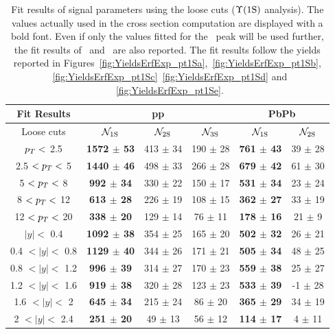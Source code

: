 \begin{table}[hbtp]
  \begin{centering}
    \begin{tabular}{c|c|c|c|c|c}
      \hline
      Fit Results &  \multicolumn{3}{c}{pp} \vline& \multicolumn{2}{c}{PbPb}  \\                                               
      \hline
      Loose cuts & ${\cal N}_{\rm 1S}$ & ${\cal N}_{\rm 2S}$ & ${\cal N}_{\rm 3S}$  &  ${\cal N}_{\rm 1S}$ &  ${\cal N}_{\rm 2S}$ \\  
      \hline                                                                                                   
      $p_{T} <$ 2.5 & \textbf{1572 $\pm$ 53} &  413 $\pm$ 34 &  190 $\pm$ 28 & \textbf{761 $\pm$ 43} & 39 $\pm$ 28 \\  
      2.5 $< p_{T} <$ 5 & \textbf{1440 $\pm$ 46} & 498 $\pm$ 33 &  266 $\pm$ 28 & \textbf{679 $\pm$ 42} & 61 $\pm$ 30  \\  
      5 $< p_{T} <$ 8 &\textbf{ 992 $\pm$ 34} &  330 $\pm$ 22 &  150 $\pm$ 17 & \textbf{531 $\pm$ 34} & 23 $\pm$ 24  \\  
      8 $< p_{T} <$ 12 &\textbf{ 613 $\pm$ 28} &  226 $\pm$ 19 &  108 $\pm$ 15 & \textbf{362 $\pm$ 27} & 33 $\pm$ 19  \\  
      12 $< p_{T} <$ 20 & \textbf{338 $\pm$ 20} &  129 $\pm$ 14 &  76 $\pm$ 11 & \textbf{178 $\pm$ 16} & 21 $\pm$ 9  \\  
      \hline
      $|y| <$ 0.4 & \textbf{1092 $\pm$ 38} &  354 $\pm$ 25 &  165 $\pm$ 20 & \textbf{502 $\pm$ 32} & 26 $\pm$ 21 \\  
      0.4 $< |y| <$ 0.8 & \textbf{1129 $\pm$ 40} &  344 $\pm$ 26 &  171 $\pm$ 21 & \textbf{505 $\pm$ 34} & 48 $\pm$ 25  \\  
      0.8 $< |y| <$ 1.2 &\textbf{ 996 $\pm$ 39} &  314 $\pm$ 27 &  170 $\pm$ 23 & \textbf{559 $\pm$ 38} & 25 $\pm$ 27  \\  
      1.2 $< |y| <$ 1.6 & \textbf{919 $\pm$ 38} &  320 $\pm$ 28 &  123 $\pm$ 23 & \textbf{533 $\pm$ 39} & -1 $\pm$ 28  \\  
      1.6 $< |y| <$ 2 & \textbf{645 $\pm$ 34} &  215 $\pm$ 24 &  86 $\pm$ 20 & \textbf{365 $\pm$ 29} & 34 $\pm$ 19  \\  
      2 $< |y| <$ 2.4 &\textbf{ 251 $\pm$ 20} &  49 $\pm$ 13 &  56 $\pm$ 12 & \textbf{114 $\pm$ 17} & 4 $\pm$ 11  \\  
      \hline
    \end{tabular}
    \caption{Fit results of signal parameters using the loose cuts
      ($\Upsilon\mathrm{(1S)}$ analysis). The values actually used in the cross
      section computation are displayed with a bold font. Even if only
      the values fitted for the \PgUa\ peak will be used further, the
      fit results of \PgUb\ and \PgUc\ are also reported. The fit
      results follow the yields reported in
      Figures~\ref{fig:YieldsErfExp_pt1Sa},~\ref{fig:YieldsErfExp_pt1Sb},
      ~\ref{fig:YieldsErfExp_pt1Sc}~\ref{fig:YieldsErfExp_pt1Sd} and
      ~\ref{fig:YieldsErfExp_pt1Se}.}
    \label{tab:YieldsLoose}
  \end{centering}
\end{table}



